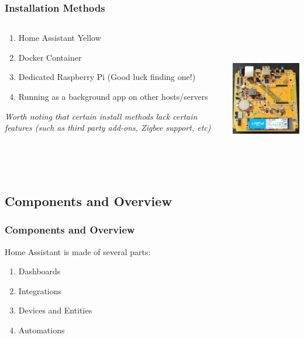 \documentclass[aspectratio=169]{beamer}
\begin{document}
\begin{frame}[fragile]
  \frametitle{Installation Methods}
  \begin{columns}[]
    \begin{column}[T]{0.45\paperwidth}
      \begin{enumerate}%
        \item{Home Assistant Yellow}
        \item{Docker Container}
        \item{Dedicated Raspberry Pi \tiny{(Good luck finding one!)}}
        \item{Running as a background app on other hosts/servers}
      \end{enumerate}
      \emph{Worth noting that certain install methods lack certain features (such as third party add-ons, Zigbee support, etc)}
    \end{column}
    \begin{column}[T]{0.45\paperwidth}
      \includegraphics[height=6cm,keepaspectratio]{images/yellow.jpg}
    \end{column}
  \end{columns}
\end{frame}

\subsection{Components and Overview}
\begin{frame}[fragile]
  \frametitle{Components and Overview}
  Home Assistant is made of several parts:
  \begin{enumerate}%
    \item{Dashboards}
    \item{Integrations}
    \item{Devices and Entities}
    \item{Automations}
  \end{enumerate}
\end{frame}
\end{document}
